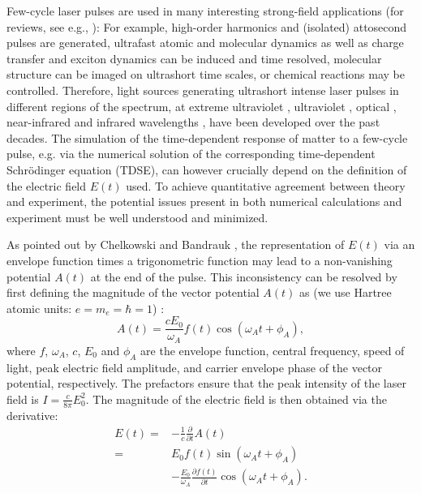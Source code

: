 Few-cycle laser pulses are used in many interesting strong-field applications (for reviews, see e.g., \cite{popmintchev10,suzuki14,vrakking14,pazourek15,wang15,xu16}): For example, high-order harmonics and (isolated) attosecond pulses are generated, ultrafast atomic and molecular dynamics as well as charge transfer and exciton dynamics can be induced and time resolved, molecular structure can be imaged on ultrashort time scales, or chemical reactions may be controlled. Therefore, light sources generating ultrashort intense laser pulses in different regions of the spectrum, at extreme ultraviolet \cite{goulielmakis08}, ultraviolet \cite{durfee99}, optical \cite{fork87}, near-infrared \cite{zhou94,nisoli96,nisoli97} and infrared wavelengths \cite{ishii14,pupeza15,li16}, have been developed over the past decades.  The simulation of the time-dependent response of matter to a few-cycle pulse, e.g. via the numerical solution of the corresponding time-dependent Schr\"odinger equation (TDSE), can however crucially depend on the definition of the electric field $E(t)$ used. To achieve quantitative agreement between theory and experiment, the potential issues present in both numerical calculations and experiment must be well understood and minimized.

As pointed out by Chelkowski and Bandrauk \cite{chelkowski02}, the representation of $E(t)$ via an envelope function times a trigonometric function may lead to a non-vanishing potential $A(t)$ at the end of the pulse. This inconsistency can be resolved by first defining the magnitude of the vector potential $A(t)$ as (we use Hartree atomic units: $e = m_e = \hbar =1$) \cite{chelkowski02}: 
\begin{equation}
A(t) = \frac{c E_0}{\omega_A}f(t) \cos(\omega_A t +\phi_A),
\label{eq:vectorpotential}
\end{equation}
where $f$, $\omega_A$, $c$, $E_0$ and $\phi_A$ are the envelope function, central frequency, speed of light, peak electric field amplitude, and carrier envelope phase of the vector potential, respectively.
The prefactors ensure that the peak intensity of the laser field is $I = \tfrac{c}{8\pi}E_0^2$.
The magnitude of the electric field is then obtained via the derivative:
\begin{equation}
\begin{split}
\label{eq:efield}
E(t) =& -\frac{1}{c}\frac{\partial}{\partial t}A(t)
\\
=&E_0f(t) \sin(\omega_A t +\phi_A)
\\
&
-\frac{E_0}{\omega_A}\frac{\partial f(t)}{\partial t}
\cos(\omega_A t +\phi_A).
\end{split}
\end{equation}

